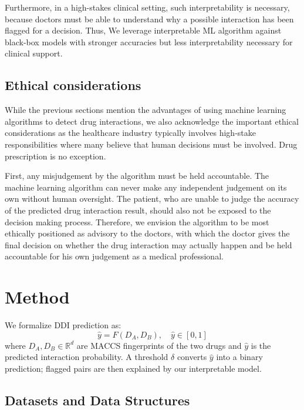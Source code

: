 \documentclass[letterpaper]{article} %
\begin{document}
Furthermore, in a high-stakes clinical setting, such interpretability is necessary, because doctors must be able to understand why a possible interaction has been flagged for a decision. Thus, We leverage interpretable ML algorithm against black-box models with stronger accuracies but less interpretability necessary for clinical support.



\subsection{Ethical considerations}

While the previous sections mention the advantages of using machine learning algorithms to detect drug interactions, we also acknowledge the important ethical considerations as the healthcare industry typically involves high-stake responsibilities where many believe that human decisions must be involved. Drug prescription is no exception. 

First, any misjudgement by the algorithm must be held accountable. The machine learning algorithm can never make any independent judgement on its own without human oversight. The patient, who are unable to judge the accuracy of the predicted drug interaction result, should also not be exposed to the decision making process. Therefore, we envision the algorithm to be most ethically positioned as advisory to the doctors, with which the doctor gives the final decision on whether the drug interaction may actually happen and be held accountable for his own judgement as a medical professional.

\section{Method}

We formalize DDI prediction as:
\begin{equation}
    \hat{y} = F(D_A, D_B), \quad \hat{y} \in [0, 1]
\end{equation}
where $D_A, D_B \in \mathbb{R}^{d}$ are MACCS fingerprints of the two drugs and $\hat{y}$ is the predicted interaction probability. A threshold $\delta$ converts $\hat{y}$ into a binary prediction; flagged pairs are then explained by our interpretable model.


\subsection{Datasets and Data Structures}
\end{document}
